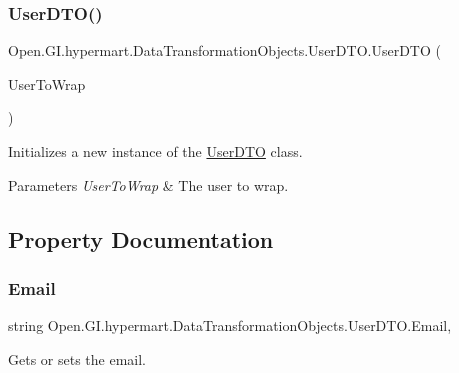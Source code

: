 \subsubsection{\texorpdfstring{User\+D\+T\+O()}{UserDTO()}\hspace{0.1cm}{\footnotesize\ttfamily [2/2]}}
{\footnotesize\ttfamily Open.\+G\+I.\+hypermart.\+Data\+Transformation\+Objects.\+User\+D\+T\+O.\+User\+D\+TO (\begin{DoxyParamCaption}\item[{\hyperlink{class_open_1_1_g_i_1_1hypermart_1_1_models_1_1_user}{Open.\+G\+I.\+hypermart.\+Models.\+User}}]{User\+To\+Wrap }\end{DoxyParamCaption})}



Initializes a new instance of the \hyperlink{class_open_1_1_g_i_1_1hypermart_1_1_data_transformation_objects_1_1_user_d_t_o}{User\+D\+TO} class. 


\begin{DoxyParams}{Parameters}
{\em User\+To\+Wrap} & The user to wrap.\\
\hline
\end{DoxyParams}


\subsection{Property Documentation}
\hypertarget{class_open_1_1_g_i_1_1hypermart_1_1_data_transformation_objects_1_1_user_d_t_o_a96fdfcc9b2aa36fb35f6612b9e99b535}{}\label{class_open_1_1_g_i_1_1hypermart_1_1_data_transformation_objects_1_1_user_d_t_o_a96fdfcc9b2aa36fb35f6612b9e99b535} 
\subsubsection{\texorpdfstring{Email}{Email}}
{\footnotesize\ttfamily string Open.\+G\+I.\+hypermart.\+Data\+Transformation\+Objects.\+User\+D\+T\+O.\+Email\hspace{0.3cm}{\ttfamily [get]}, {\ttfamily [set]}}



Gets or sets the email. 

